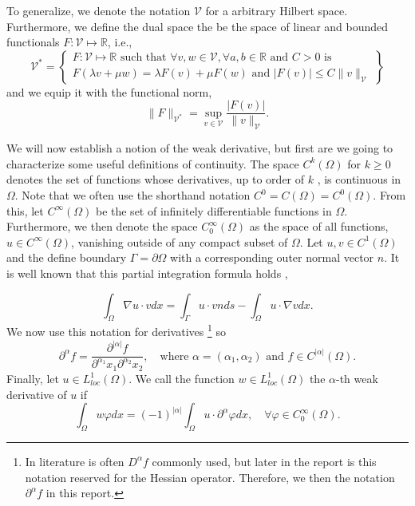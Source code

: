 To generalize, we denote the notation $\mathcal{V} $ for a arbitrary Hilbert space. Furthermore, we define the dual space the be the space of linear and bounded functionals $F: \mathcal{V}  \mapsto \mathbb{R} $\cite{quartdiff}, i.e., \[
\mathcal{V} ^{*} =
\left.
\begin{cases}
F: \mathcal{V}  \mapsto \mathbb{R} \text{ such that }\forall v,w \in \mathcal{V}, \forall a,b \in \mathbb{R} \text{ and } C> 0 \text{ is }   \\
  F\left( \lambda v + \mu w  \right) = \lambda F(v) + \mu F(w) \text{ and } \left\lvert F\left( v \right)  \right\rvert \le C \| v \|_{ \mathcal{V}  }^{  }
\end{cases}
  \right\}
\]
and we equip it with the functional norm,  \[
    \| F \|_{ \mathcal{V} ^{*} }^{  } = \sup_{v \in \mathcal{V}   } \frac{\left\lvert F\left( v \right)  \right\rvert }{\| v \|_{ \mathcal{V}  }^{  } }.
\]

We will now establish a notion of the weak derivative, but first are we going to characterize some useful definitions of continuity. The space $C^{k}\left( \Omega  \right) $ for $k\ge 0$ denotes the set of functions whose derivatives, up to order of
$k$ , is continuous in $\Omega $. Note that we often use the shorthand notation $ C^{0} = C\left( \Omega  \right)  = C^{0}\left( \Omega  \right) $.
From this, let $C^{\infty}\left( \Omega  \right) $ be the set of infinitely differentiable functions in $\Omega $. Furthermore, we then denote the space $C^{\infty}_{0}\left( \Omega  \right)$ as the space of all functions, $u \in C^{\infty}\left( \Omega
\right) $, vanishing outside of any compact subset of $\Omega $. Let $u,v \in  C^{1}\left( \Omega  \right) $ and the define boundary $\Gamma  = \partial \Omega $ with a corresponding outer normal vector $n$. It is well known that this partial
integration formula holds \cite{manzoni2021optimal},

\[
\int_{\Omega }^{} \nabla u \cdot v dx = \int_{\Gamma }^{} u\cdot v n ds - \int_{\Omega }^{} u \cdot \nabla v dx.
\]
We now use this notation for derivatives
\footnote{In literature is often $D^{\alpha } f$ commonly used, but later in the report is this notation reserved for the Hessian operator. Therefore, we then the notation $\partial ^{\alpha } f$ in this report.} so
\begin{equation}
\label{eq:mixed_derivative}
\partial ^{\alpha  } f = \frac{\partial ^{\left\lvert \alpha  \right\rvert } f}{ \partial ^{\alpha _{1} } x_{1} \partial ^{\alpha _{2}} x_{2}  }, \quad \text{where } \alpha=\left( \alpha _{1}, \alpha _{2} \right) \text{ and } f \in C^{\left\lvert \alpha  \right\rvert }
\left( \Omega  \right)
.\end{equation}
Finally, let $u \in  L^{1}_{loc}\left( \Omega  \right) $. We call the function $w \in L_{loc}^{1}\left( \Omega  \right) $ the $\alpha $-th weak derivative of $u$  if \[
\int_{\Omega }^{} w \varphi  dx = \left( -1 \right) ^{\left\lvert \alpha  \right\rvert } \int_{\Omega }^{} u \cdot \partial ^{\alpha } \varphi dx, \quad \forall \varphi \in  C_{0}^{\infty}\left( \Omega  \right).
\]

